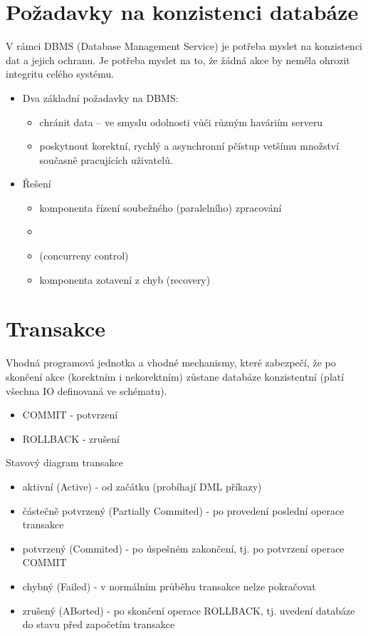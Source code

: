 \documentclass{szzclass}
\begin{document}
\tableofcontents
\newpage

\section{Požadavky na konzistenci databáze}

V rámci DBMS (Database Management Service) je potřeba myslet na konzistenci dat a jejich ochranu. Je potřeba
myslet na to, že žádná akce by neměla ohrozit integritu celého systému.

\begin{itemize}
\item Dva základní požadavky na DBMS:
  \begin{itemize}
  \item chránit data – ve smyslu odolnosti vůči různým haváriím serveru
  \item poskytnout korektní, rychlý a asynchronní pčístup vetšímu množství současně pracujících uživatelů.
  \end{itemize}
\item Řešení
  \begin{itemize}
  \item komponenta řízení soubežného (paralelního) zpracování
  \item \item   (concurreny control)
  \item komponenta zotavení z chyb (recovery)
  \end{itemize}
\end{itemize}

\section{Transakce}

Vhodná programová jednotka a vhodné mechanismy, které zabezpečí, že po skončení akce (korektním i nekorektním) zůstane databáze konzistentní (platí všechna IO definovaná ve schématu).

\begin{itemize}
\item COMMIT - potvrzení
\item ROLLBACK - zrušení
\end{itemize}

Stavový diagram transakce

\begin{itemize}
\item aktivní (Active) - od začátku (probíhají DML příkazy)
\item částečně potvrzený (Partially Commited) - po provedení poslední operace transakce
\item potvrzený (Commited) - po úspešném zakončení, tj. po potvrzení operace COMMIT
\item chybný (Failed) - v normálním průběhu transakce nelze pokračovat
\item zrušený (ABorted) - po skončení operace ROLLBACK, tj. uvedení databáze do stavu před započetím transakce
\end{itemize}
\end{document}
